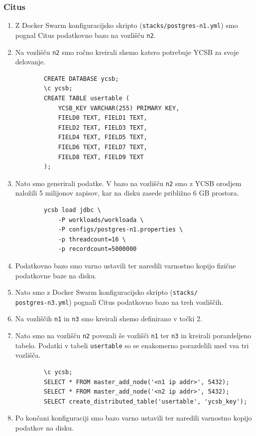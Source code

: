 \documentclass[a4paper, 12pt]{book}
\begin{document}
\subsubsection{Citus}
\begin{enumerate}
    \item Z Docker Swarm konfiguracijsko skripto (\texttt{stacks/postgres-n1.yml}) smo pognal Citus podatkovno bazo na vozlišču \texttt{n2}.
    \item Na vozlišču \texttt{n2} smo ročno kreirali shemo katero potrebuje YCSB za svoje delovanje.
    \begin{listing}[H]
    \begin{verbatim}
        CREATE DATABASE ycsb;
        \c ycsb;
        CREATE TABLE usertable (
            YCSB_KEY VARCHAR(255) PRIMARY KEY,
            FIELD0 TEXT, FIELD1 TEXT,
            FIELD2 TEXT, FIELD3 TEXT,
            FIELD4 TEXT, FIELD5 TEXT,
            FIELD6 TEXT, FIELD7 TEXT,
            FIELD8 TEXT, FIELD9 TEXT
        );
    \end{verbatim}
    \label{code-ycsb-schema-postgres}
    \end{listing}
    \item Nato smo generirali podatke. V bazo na vozlišču \texttt{n2} smo z YCSB orodjem naložili 5 milijonov zapisov, kar na disku zasede približno 6 GB prostora.
    \begin{listing}[H]
    \begin{verbatim}
        ycsb load jdbc \
            -P workloads/workloada \
            -P configs/postgres-n1.properties \
            -p threadcount=16 \
            -p recordcount=5000000
    \end{verbatim}
    \label{code-ycsb-load-postgres}
    \end{listing}
    \item Podatkovno bazo smo varno ustavili ter naredili varnostno kopijo fizične podatkovne baze na disku.
    \item Nato smo z Docker Swarm konfiguracijsko skripto (\texttt{stacks/\\postgres-n3.yml}) pognali Citus podatkovno bazo na treh vozliščih.
    \item Na vozliščih \texttt{n1} in \texttt{n3} smo kreirali shemo definirano v točki 2.
    \item Nato smo na vozlišču \texttt{n2} povezali še vozlišči \texttt{n1} ter \texttt{n3} in kreirali porazdeljeno tabelo. Podatki v tabeli \texttt{usertable} so se enakomerno porazdelili med vsa tri vozlišča.
    \begin{listing}[H]
    \begin{verbatim}
        \c ycsb;
        SELECT * FROM master_add_node('<n1 ip addr>', 5432);
        SELECT * FROM master_add_node('<n2 ip addr>', 5432);
        SELECT create_distributed_table('usertable', 'ycsb_key');
    \end{verbatim}
    \label{code-ycsb-add-node-citus}
    \end{listing}
    \item Po končani konfiguraciji smo bazo varno ustavili ter naredili varnostno kopijo podatkov na disku.
\end{enumerate}
\end{document}
